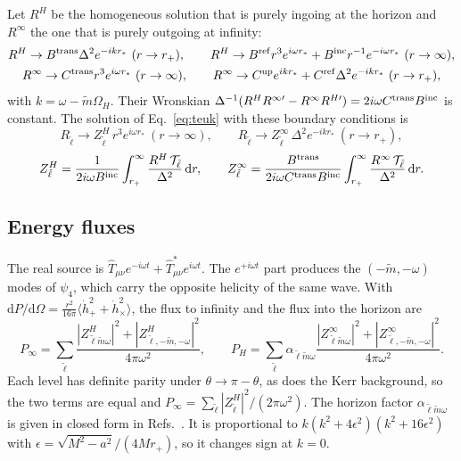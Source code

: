 \documentclass[11pt]{article}
\newcommand{\dd}{\mathrm{d}}
\begin{document}
Let $R^H$ be the homogeneous solution that is purely ingoing at the horizon and $R^\infty$ the one that is purely outgoing at infinity:
\begin{gather}
R^H\to B^{\rm trans}\Delta^2e^{-ikr_*}\ (r\to r_+),\qquad R^H\to B^{\rm ref}r^3e^{i\omega r_*}+B^{\rm inc}r^{-1}e^{-i\omega r_*}\ (r\to\infty),\nonumber\\
R^\infty\to C^{\rm trans}r^3e^{i\omega r_*}\ (r\to\infty),\qquad R^\infty\to C^{\rm up}e^{ikr_*}+C^{\rm ref}\Delta^2e^{-ikr_*}\ (r\to r_+),
\end{gather}
with $k=\omega-\tilde m\Omega_H$. Their Wronskian $\Delta^{-1}(R^HR^{\infty\prime}-R^\infty R^{H\prime})=2i\omega C^{\rm trans}B^{\rm inc}$ is constant. The solution of Eq.~\eqref{eq:teuk} with these boundary conditions is
\begin{equation}
R_{\tilde\ell}\to Z^H_{\tilde\ell}\,r^3e^{i\omega r_*}\ (r\to\infty),\qquad
R_{\tilde\ell}\to Z^\infty_{\tilde\ell}\,\Delta^2e^{-ikr_*}\ (r\to r_+),
\end{equation}
\begin{equation}
Z^H_{\tilde\ell}=\frac{1}{2i\omega B^{\rm inc}}\int_{r_+}^\infty\frac{R^H\,\mathcal T_{\tilde\ell}}{\Delta^2}\,\dd r,\qquad
Z^\infty_{\tilde\ell}=\frac{B^{\rm trans}}{2i\omega C^{\rm trans}B^{\rm inc}}\int_{r_+}^\infty\frac{R^\infty\,\mathcal T_{\tilde\ell}}{\Delta^2}\,\dd r .
\label{eq:Zamps}
\end{equation}

\subsection{Energy fluxes}
\label{sec:kerr-flux}

The real source is $\hat T_{\mu\nu}e^{-i\omega t}+\hat T^*_{\mu\nu}e^{i\omega t}$. The $e^{+i\omega t}$ part produces the $(-\tilde m,-\omega)$ modes of $\psi_4$, which carry the opposite helicity of the same wave. With $\dd P/\dd\Omega=\frac{r^2}{16\pi}\langle\dot h_+^2+\dot h_\times^2\rangle$, the flux to infinity and the flux into the horizon are
\begin{equation}
P_\infty=\sum_{\tilde\ell}\frac{|Z^H_{\tilde\ell\tilde m\omega}|^2+|Z^H_{\tilde\ell,-\tilde m,-\omega}|^2}{4\pi\omega^2},\qquad
P_H=\sum_{\tilde\ell}\alpha_{\tilde\ell\tilde m\omega}\frac{|Z^\infty_{\tilde\ell\tilde m\omega}|^2+|Z^\infty_{\tilde\ell,-\tilde m,-\omega}|^2}{4\pi\omega^2}.
\label{eq:kerrflux}
\end{equation}
Each level has definite parity under $\theta\to\pi-\theta$, as does the Kerr background, so the two terms are equal and $P_\infty=\sum_{\tilde\ell}|Z^H_{\tilde\ell}|^2/(2\pi\omega^2)$. The horizon factor $\alpha_{\tilde\ell\tilde m\omega}$ is given in closed form in Refs.~\cite{TP74,Hughes00}. It is proportional to $k(k^2+4\epsilon^2)(k^2+16\epsilon^2)$ with $\epsilon=\sqrt{M^2-a^2}/(4Mr_+)$, so it changes sign at $k=0$.
\end{document}
